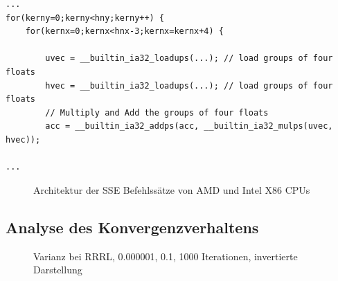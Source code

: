 \documentclass[a4paper,12pt]{article}
\begin{document}
\begin{lstlisting}[float,caption={verwendete x86 build-in
SSE Erweiterungen},label=lst:listData]
...
for(kerny=0;kerny<hny;kerny++) {
	for(kernx=0;kernx<hnx-3;kernx=kernx+4) {
		
		uvec = __builtin_ia32_loadups(...); // load groups of four floats
		hvec = __builtin_ia32_loadups(...); // load groups of four floats
		// Multiply and Add the groups of four floats
		acc = __builtin_ia32_addps(acc, __builtin_ia32_mulps(uvec, hvec));
 
...
\end{lstlisting}
 

\begin{figure}[htbp]
\caption{Architektur der SSE Befehlssätze von AMD und Intel X86 CPUs
\cite{sse_arch}}%
\label{figure_sse_arch}
\end{figure}


\subsection{Analyse des Konvergenzverhaltens}\label{chp:methodik_konvergenz} 


\begin{figure}[htbp]
\caption{Varianz bei RRRL, 0.000001, 0.1, 1000 Iterationen, invertierte
Darstellung}%
\label{figure_konver_altes_bild}
\end{figure}
\end{document}
